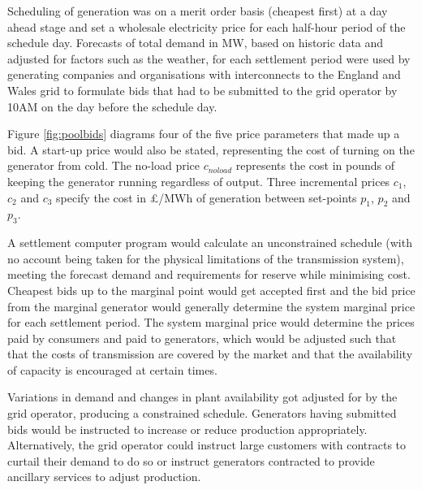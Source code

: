 Scheduling of generation was on a merit order basis (cheapest first) at a day
ahead stage and set a wholesale electricity price for each half-hour period of
the schedule day.  Forecasts of total demand in MW, based on historic data and
adjusted for factors such as the weather, for each settlement period were used
by generating companies and organisations with interconnects to the England
and Wales grid to formulate bids that had to be submitted to the grid operator
by 10AM on the day before the schedule day.

%

Figure \ref{fig:poolbids} diagrams four of the five price parameters
that made up a bid.  A start-up price would also be stated, representing the
cost of turning on the generator from cold.  The no-load price $c_{noload}$
represents the cost in pounds of keeping the generator running regardless of output. Three
incremental prices $c_1$, $c_2$ and $c_3$ specify the cost in \pounds/MWh of
generation between set-points $p_1$, $p_2$ and $p_3$.

A settlement computer program would calculate an unconstrained schedule
(with no account being taken for the physical limitations of the transmission
system), meeting the forecast demand and requirements for reserve while minimising cost.
Cheapest bids up to the marginal point would get accepted first and the bid
price from the marginal generator would generally determine the system marginal
price for each settlement period.  The system marginal price would determine
the prices paid by consumers and paid to generators, which would be adjusted
such that that the costs of transmission are covered by the market and that the
availability of capacity is encouraged at certain times.

Variations in demand and changes in plant availability got adjusted for by
the grid operator, producing a constrained schedule.  Generators having
submitted bids would be instructed to increase or reduce production
appropriately.  Alternatively, the grid operator could instruct large customers
with contracts to curtail their demand to do so or instruct generators
contracted to provide ancillary services to adjust production.

